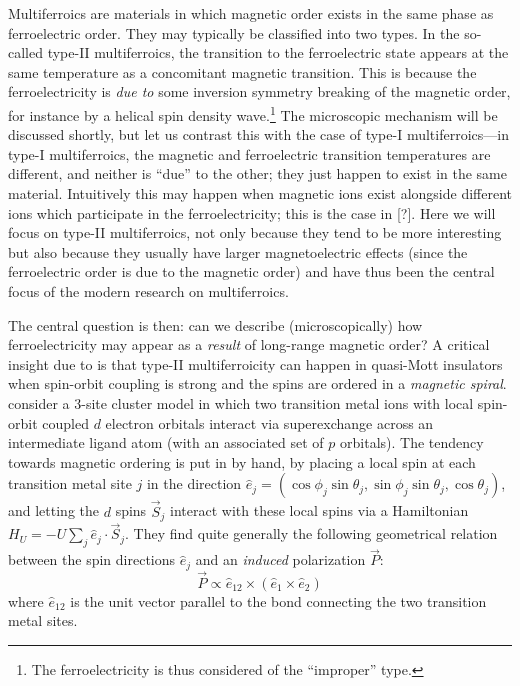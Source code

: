 Multiferroics are materials in which magnetic order exists in the same phase as ferroelectric order.
They may typically be classified into two types.
In the so-called type-II multiferroics, the transition to the ferroelectric state appears at the same temperature as a concomitant magnetic transition.
This is because the ferroelectricity is \emph{due to} some inversion symmetry breaking of the magnetic order, for instance by a helical spin density wave.\footnote{The ferroelectricity is thus considered of the ``improper'' type.}
The microscopic mechanism will be discussed shortly, but let us contrast this with the case of type-I multiferroics---in type-I multiferroics, the magnetic and ferroelectric transition temperatures are different, and neither is ``due'' to the other; they just happen to exist in the same material.
Intuitively this may happen when magnetic ions exist alongside different ions which participate in the ferroelectricity; this is the case in [?].
Here we will focus on type-II multiferroics, not only because they tend to be more interesting but also because they usually have larger magnetoelectric effects (since the ferroelectric order is due to the magnetic order) and have thus been the central focus of the modern research on multiferroics.

The central question is then: can we describe (microscopically) how ferroelectricity may appear as a \emph{result} of long-range magnetic order?
A critical insight due to \citet{katsura_spin_2005} is that type-II multiferroicity can happen in quasi-\oned Mott insulators when spin-orbit coupling is strong and the spins are ordered in a \emph{magnetic spiral}.
\citet{katsura_spin_2005} consider a \num{3}-site \oned cluster model in which two transition metal ions with local spin-orbit coupled $d$ electron orbitals interact via superexchange across an intermediate ligand atom (with an associated set of $p$ orbitals).
The tendency towards magnetic ordering is put in by hand, by placing a local spin at each transition metal site $j$ in the direction $\hat{e}_j = (\cos\phi_j \sin\theta_j, \sin\phi_j \sin\theta_j, \cos\theta_j)$, and letting the $d$ spins $\vec{S}_j$ interact with these local spins via a Hamiltonian $H_U=-U\sum_j \hat{e}_j\cdot \vec{S}_j$.
They find quite generally the following geometrical relation between the spin directions $\hat{e}_j$ and an \emph{induced} polarization $\vec{P}$:
\begin{equation}\label{eq:knbtheoryequation}
\vec{P} \propto \hat{e}_{12}\times(\hat{e}_1\times\hat{e}_2)
\end{equation}
where $\hat{e}_{12}$ is the unit vector parallel to the bond connecting the two transition metal sites.

